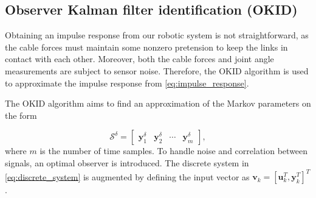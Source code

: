 \documentclass[../main.tex]{subfiles}
\begin{document}
\subsection{Observer Kalman filter identification (OKID)}

Obtaining an impulse response from our robotic system is not straightforward, as the cable forces must maintain some nonzero pretension to keep the links in contact with each other. Moreover, both the cable forces and joint angle measurements are subject to sensor noise. Therefore, the OKID algorithm is used to approximate the impulse response from \eqref{eq:impulse_response}.

The OKID algorithm aims to find an approximation of the Markov parameters on the form

\begin{equation}
\label{eq:okid_sdelta}
    \bm{\mathcal{S}}^{\delta} = \begin{bmatrix}
        \bm{y}_1^{\delta} & \bm{y}_2^{\delta} & \cdots & \bm{y}_{m}^{\delta}
    \end{bmatrix},
\end{equation}
where $m$ is the number of time samples.
To handle noise and correlation between signals, an optimal observer is introduced.  The discrete system in \eqref{eq:discrete_system} is augmented by defining the input vector as $\bm{v}_k = \left[ \bm{u}_k^T, \bm{y}_k^T \right]^T$.
\end{document}
